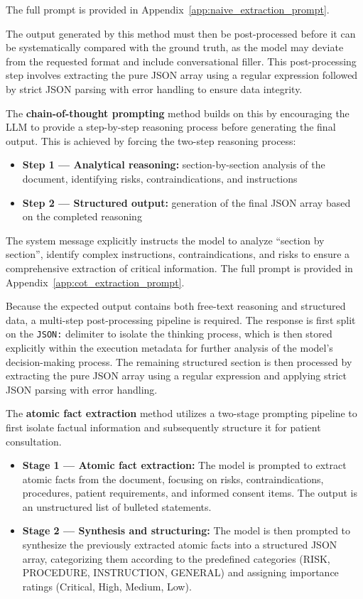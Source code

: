 The full prompt is provided in Appendix~\ref{app:naive_extraction_prompt}.

The output generated by this method must then be post-processed before it can be systematically compared with the ground truth, as the model may deviate from the requested format and include conversational filler.
This post-processing step involves extracting the pure JSON array using a regular expression followed by strict JSON parsing with error handling to ensure data integrity.

The \textbf{chain-of-thought prompting} method builds on this by encouraging the LLM to provide a step-by-step reasoning process before generating the final output.
This is achieved by forcing the two-step reasoning process:
\begin{itemize}
    \item \textbf{Step 1 — Analytical reasoning:} section-by-section analysis of the document, identifying risks, contraindications, and instructions
    \item \textbf{Step 2 — Structured output:} generation of the final JSON array based on the completed reasoning
\end{itemize}
The system message explicitly instructs the model to analyze ``section by section'', identify complex instructions, contraindications, and risks to ensure a comprehensive extraction of critical information.
The full prompt is provided in Appendix~\ref{app:cot_extraction_prompt}.

Because the expected output contains both free-text reasoning and structured data, a multi-step post-processing pipeline is required. The response is first split on the \texttt{JSON:} delimiter to isolate the thinking process, which is then stored explicitly within the execution metadata for further analysis of the model's decision-making process. The remaining structured section is then processed by extracting the pure JSON array using a regular expression and applying strict JSON parsing with error handling.

The \textbf{atomic fact extraction} method utilizes a two-stage prompting pipeline to first isolate factual information and subsequently structure it for patient consultation. 
\begin{itemize}
    \item \textbf{Stage 1 — Atomic fact extraction:} The model is prompted to extract atomic facts from the document, focusing on risks, contraindications, procedures, patient requirements, and informed consent items. The output is an unstructured list of bulleted statements.
    \item \textbf{Stage 2 — Synthesis and structuring:} The model is then prompted to synthesize the previously extracted atomic facts into a structured JSON array, categorizing them according to the predefined categories (RISK, PROCEDURE, INSTRUCTION, GENERAL) and assigning importance ratings (Critical, High, Medium, Low).
\end{itemize}

